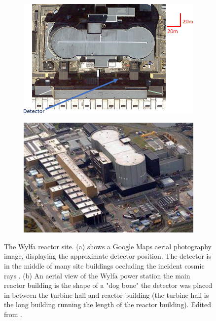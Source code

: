 \begin{figure}[!h]
\centering
\begin{subfigure}{.5\textwidth}
  \centering
  \includegraphics[width=\linewidth]{Chapter5/Figs/wylfaRasterNew/DetectorPositionTopDown.png}
  \captionsetup{width=.9\linewidth}
  \caption{}
  \label{subFig:DetectorPositionTopDown}
\end{subfigure}%
\begin{subfigure}{.5\textwidth}
  \centering
\includegraphics[width=\linewidth]{Chapter5/Figs/Raster/wylfaArielView.png}
  \captionsetup{width=.9\linewidth}
  \caption{}
  \label{subFig:wylfaArielView}
\end{subfigure}
\caption[Aerial views of the Wylfa reactor site.]{The Wylfa reactor site. (a) shows a Google Maps aerial photography image, displaying the approximate detector position. The detector is in the middle of many site buildings occluding the incident cosmic rays \cite{GoogleMapsWylfaLink}. (b) An aerial view of the Wylfa power station the main reactor building is the shape of a "dog bone" the detector was placed in-between the turbine hall and reactor building (the turbine hall is the long building running the length of the reactor building). Edited from \cite{wylfaDronePictureLink}.}
\label{fig:DetectorPosition_TopDownAndAriel}
\end{figure}

